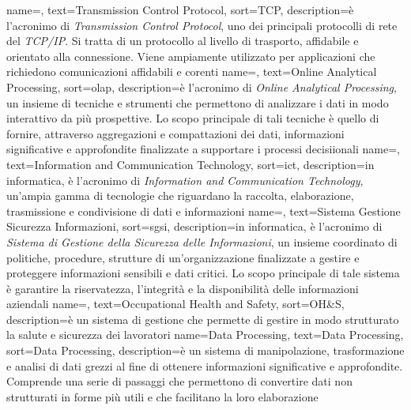  {
    name=,
    text=Transmission Control Protocol,
    sort=TCP,
    description={è l'acronimo di \textit{Transmission Control Protocol}, uno dei principali protocolli di rete del \textit{TCP/IP}. Si tratta di un 
    protocollo al livello di trasporto, affidabile e orientato alla connessione. Viene ampiamente utilizzato per applicazioni 
    che richiedono comunicazioni affidabili e corenti}
}
 {
    name=,
    text=Online Analytical Processing,
    sort=olap,
    description={è l'acronimo di \textit{Online Analytical Processing}, un insieme di tecniche e strumenti che permettono di analizzare i dati in modo 
    interattivo da più prospettive. Lo scopo principale di tali tecniche è quello di fornire, attraverso aggregazioni e compattazioni dei dati, informazioni 
    significative e approfondite finalizzate a supportare i processi decisiionali
    }
}
 {
    name=,
    text=Information and Communication Technology,
    sort=ict,
    description={in informatica, è l'acronimo di \textit{Information and Communication Technology}, un'ampia gamma di tecnologie che riguardano la raccolta, 
    elaborazione, trasmissione e condivisione di dati e informazioni}
}
 {
    name=,
    text=Sistema Gestione Sicurezza Informazioni,
    sort=sgsi,
    description={in informatica, è l'acronimo di \textit{Sistema di Gestione della Sicurezza delle Informazioni}, un insieme coordinato di politiche, procedure, strutture di un'organizzazione finalizzate a 
    gestire e proteggere informazioni sensibili e dati critici. Lo scopo principale di tale sistema è garantire la riservatezza, l'integrità 
    e la disponibilità delle informazioni aziendali}
}
 {
    name=,
    text=Occupational Health and Safety,
    sort=OH\&S,
    description={è un sistema di gestione che permette di gestire in modo strutturato la salute e sicurezza dei lavoratori}
}
{
    name={Data Processing},
    text=Data Processing,
    sort=Data Processing,
    description={è un sistema di manipolazione, trasformazione e analisi di dati grezzi al fine di ottenere informazioni significative e approfondite. Comprende una serie di passaggi che permettono di convertire dati non strutturati in forme più utili e che facilitano la loro elaborazione}
}
